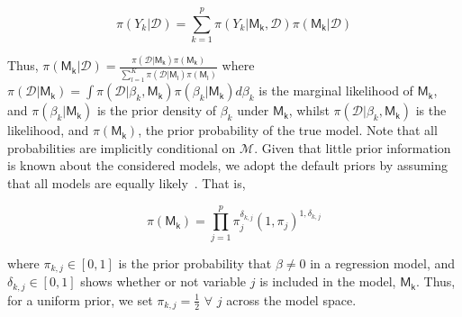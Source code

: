 \documentclass[12pt, english]{article}
\begin{document}
    \begin{equation}
        \label{equ19:bma}
        \pi(Y_k | \mathcal{D}) = \sum_{k = 1}^p \pi(Y_k | \mathsf{M_k}, \mathcal{D}) \pi(\mathsf{M_k} | \mathcal{D})
    \end{equation}

    Thus, $\pi(\mathsf{M_k} | \mathcal{D}) = \frac{\pi(\mathcal{D} | \mathsf{M_k}) \pi(\mathsf{M_k})}{\sum_{l = 1}^K \pi(\mathcal{D} | \mathsf{M_l}) \pi(\mathsf{M_l})}$ where $\pi(\mathcal{D} | \mathsf{M_k}) = \int\pi(\mathcal{D} | \beta_k, \mathsf{M_k}) \pi(\beta_k | \mathsf{M_k})d \beta_k$ is the marginal likelihood of $\mathsf{M_k}$, and $\pi(\beta_k | \mathsf{M_k})$ is the prior density of $\beta_k$ under $\mathsf{M_k}$, whilst $\pi(\mathcal{D} | \beta_k, \mathsf{M_k})$ is the likelihood, and $\pi(\mathsf{M_k})$, the prior probability of the true model. Note that all probabilities are implicitly conditional on $\mathcal{M}$. Given that little prior information is known about the considered models, we adopt the default priors by assuming that all models are equally likely~\parencite{hoeting1999}. That is,

    \begin{equation}
        \label{equ20:default-priors}
        \pi(\mathsf{M_k}) = \prod_{j = 1}^p \pi_{j}^{\delta_{k, j}} (1, \pi_j)^{1, \delta_{k, j}}
    \end{equation}

    where $\pi_{k, j} \in [0,1]$ is the prior probability that $\beta \neq 0$ in a regression model, and $\delta_{k, j} \in [0,1]$ shows whether or not variable $j$ is included in the model, $\mathsf{M_k}$. Thus, for a uniform prior, we set $\pi_{k, j} = \frac{1}{2}$ $\forall$ $j$ across the model space.
\end{document}
